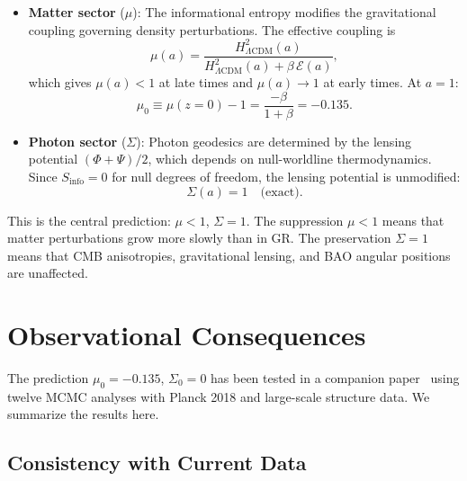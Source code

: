 \documentclass[11pt]{article}
\begin{document}
\begin{itemize}
\item \textbf{Matter sector} ($\mu$): The informational entropy modifies the
  gravitational coupling governing density perturbations.  The effective
  coupling is
  \begin{equation}
  \mu(a) = \frac{H^2_{\Lambda\mathrm{CDM}}(a)}
    {H^2_{\Lambda\mathrm{CDM}}(a) + \beta\,\mathcal{E}(a)},
  \label{eq:mu_a}
  \end{equation}
  which gives $\mu(a) < 1$ at late times and $\mu(a) \to 1$ at early times.
  At $a = 1$:
  \begin{equation}
  \mu_0 \equiv \mu(z{=}0) - 1 = \frac{-\beta}{1 + \beta} = -0.135.
  \label{eq:mu0}
  \end{equation}

\item \textbf{Photon sector} ($\Sigma$): Photon geodesics are determined by
  the lensing potential $(\Phi + \Psi)/2$, which depends on null-worldline
  thermodynamics.  Since $S_\mathrm{info} = 0$ for null degrees of freedom,
  the lensing potential is unmodified:
  \begin{equation}
  \Sigma(a) = 1 \quad \text{(exact)}.
  \label{eq:sigma_1}
  \end{equation}
\end{itemize}

This is the central prediction: $\mu < 1$, $\Sigma = 1$.  The suppression
$\mu < 1$ means that matter perturbations grow more slowly than in GR.  The
preservation $\Sigma = 1$ means that CMB anisotropies, gravitational lensing,
and BAO angular positions are unaffected.


\section{Observational Consequences}
\label{sec:observational}

The prediction $\mu_0 = -0.135$, $\Sigma_0 = 0$ has been tested in a companion
paper~\citep{Mahaffey2026obs} using twelve MCMC analyses with Planck 2018
and large-scale structure data.  We summarize the results here.

\subsection{Consistency with Current Data}
\end{document}
